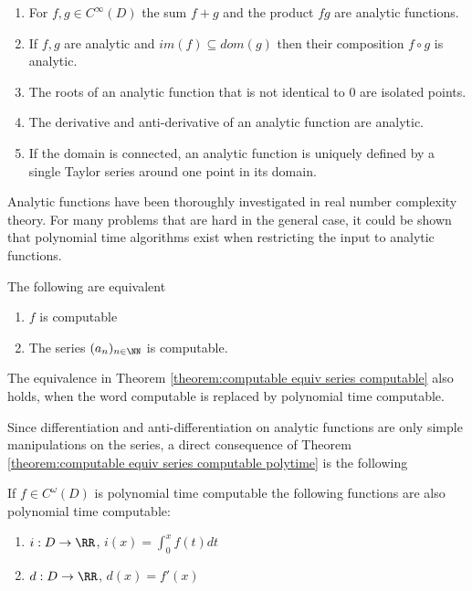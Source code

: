 		\begin{enumerate}
			\item For $f,g \in C^\infty(D)$ the sum  $f+g$ and the product $fg$ are analytic functions.
			\item If $f, g$ are analytic and $im(f) \subseteq dom(g)$ then their composition $f \circ g$ is analytic.
			\item The roots of an analytic function that is not identical to $0$ are isolated points.
			\item The derivative and anti-derivative of an analytic function are analytic.
			\item If the domain is connected, an analytic function is uniquely defined by a single Taylor series around one point in its domain.
		\end{enumerate}

		Analytic functions have been thoroughly investigated in real number complexity theory.
		For many problems that are hard in the general case, it could be shown that polynomial time algorithms exist when restricting the input to
		analytic functions.

		\begin{theorem}\label{theorem:computable equiv series computable} 
			The following are equivalent
			\begin{enumerate}
				\item $f$ is computable 
				\item The series $(a_n)_{n \in \NN}$ is computable. 
 			\end{enumerate}
		\end{theorem}
		\begin{theorem}[M\"uller]\label{theorem:computable equiv series computable polytime}
			The equivalence in Theorem \ref{theorem:computable equiv series computable} also holds, when the word computable is replaced by polynomial time computable.
		\end{theorem}
		
		Since differentiation and anti-differentiation on analytic functions are only simple manipulations on the series, 
		a direct consequence of Theorem \ref{theorem:computable equiv series computable polytime} is the following
		\begin{corollary}
			If $f \in C^\omega(D)$ is polynomial time computable the following functions are also polynomial time computable:
			\begin{enumerate}
				\item $i: D \to \RR$, $i(x) = \int_0^x f(t) dt$
				\item $d: D \to \RR$, $d(x) = f'(x)$ 
			\end{enumerate}
		\end{corollary}
		
